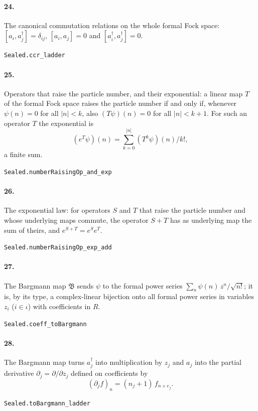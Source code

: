 \documentclass[11pt]{article}
\begin{document}
\paragraph{24.} The canonical commutation relations on the whole formal Fock space: $[a_i, a_j^\dagger] = \delta_{ij}$, $[a_i, a_j] = 0$ and $[a_i^\dagger, a_j^\dagger] = 0$.\par{\footnotesize\texttt{Sealed.ccr\_ladder}}

\paragraph{25.} Operators that raise the particle number, and their exponential: a linear map $T$ of the formal Fock space raises the particle number if and only if, whenever $\psi(n) = 0$ for all $|n| < k$, also $(T\psi)(n) = 0$ for all $|n| < k + 1$. For such an operator $T$ the exponential is \[(e^T \psi)(n) = \sum_{k=0}^{|n|} (T^k \psi)(n) / k!,\] a finite sum.\par{\footnotesize\texttt{Sealed.numberRaisingOp\_and\_exp}}

\paragraph{26.} The exponential law: for operators $S$ and $T$ that raise the particle number and whose underlying maps commute, the operator $S + T$ has as underlying map the sum of theirs, and $e^{S+T} = e^S e^T$.\par{\footnotesize\texttt{Sealed.numberRaisingOp\_exp\_add}}

\paragraph{27.} The Bargmann map $\mathfrak B$ sends $\psi$ to the formal power series $\sum_n \psi(n)\, z^n / \sqrt{n!}$; it is, by its type, a complex-linear bijection onto all formal power series in variables $z_i$ ($i \in \iota$) with coefficients in $R$.\par{\footnotesize\texttt{Sealed.coeff\_toBargmann}}

\paragraph{28.} The Bargmann map turns $a_j^\dagger$ into multiplication by $z_j$ and $a_j$ into the partial derivative $\partial_j = \partial / \partial z_j$ defined on coefficients by \[(\partial_j f)_n = (n_j + 1)\, f_{n + e_j}.\]\par{\footnotesize\texttt{Sealed.toBargmann\_ladder}}
\end{document}

